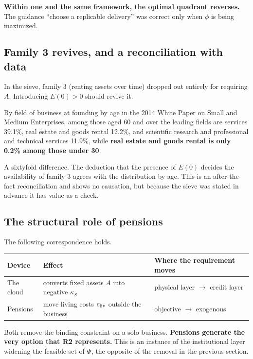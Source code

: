 \textbf{Within one and the same framework, the optimal quadrant reverses.}
The guidance ``choose a replicable delivery'' was correct only when $\phi$ is being maximized.

\subsection{Family 3 revives, and a reconciliation with data}

In the sieve, family 3 (renting assets over time) dropped out entirely for requiring $A$.
Introducing $E(0)>0$ should revive it.

By field of business at founding by age in the 2014 White Paper on Small and Medium
Enterprises, among those aged 60 and over the leading fields are services 39.1\%, real estate
and goods rental 12.2\%, and scientific research and professional and technical services
11.9\%, while \textbf{real estate and goods rental is only 0.2\% among those under 30}.

A sixtyfold difference. The deduction that the presence of $E(0)$ decides the availability of
family 3 agrees with the distribution by age. This is an after-the-fact reconciliation and
shows no causation, but because the sieve was stated in advance it has value as a check.

\subsection{The structural role of pensions}

The following correspondence holds.

\begin{center}
\begin{tabularx}{\textwidth}{@{}lXl@{}}
\toprule
Device & Effect & Where the requirement moves \\
\midrule
The cloud & converts fixed assets $A$ into negative $\kappa_S$ & physical layer $\to$ credit layer \\
Pensions & move living costs $c_{\rm liv}$ outside the business & objective $\to$ exogenous \\
\bottomrule
\end{tabularx}
\label{tab:solo-constraint-relief}
\end{center}

Both remove the binding constraint on a solo business.
\textbf{Pensions generate the very option that R2 represents.} This is an instance of the
institutional layer widening the feasible set of $\Phi$, the opposite of the removal in the
previous section.

